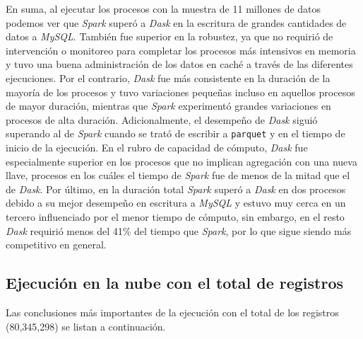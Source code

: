 En suma, al ejecutar los procesos con la muestra de 11 millones de datos podemos ver que \textit{Spark} superó a \textit{Dask} en la escritura de grandes cantidades de datos a \textit{MySQL}. También fue superior en la robustez, ya que no requirió de intervención o monitoreo para completar los procesos más intensivos en memoria y tuvo una buena administración de los datos en caché a través de las diferentes ejecuciones. Por el contrario, \textit{Dask} fue más consistente en la duración de la mayoría de los procesos y tuvo variaciones pequeñas incluso en aquellos procesos de mayor duración, mientras que \textit{Spark} experimentó grandes variaciones en procesos de alta duración. Adicionalmente, el desempeño de \textit{Dask} siguió superando al de \textit{Spark} cuando se trató de escribir a \texttt{parquet} y en el tiempo de inicio de la ejecución. En el rubro de capacidad de cómputo, \textit{Dask} fue especialmente superior en los procesos que no implican agregación con una nueva llave, procesos en los cuáles el tiempo de \textit{Spark} fue de menos de la mitad que el de \textit{Dask}. Por último, en la duración total \textit{Spark} superó a \textit{Dask} en dos procesos debido a su mejor desempeño en escritura a \textit{MySQL} y estuvo muy cerca en un tercero influenciado por el menor tiempo de cómputo, sin embargo, en el resto \textit{Dask} requirió menos del 41\% del tiempo que \textit{Spark}, por lo que sigue siendo más competitivo en general. 



\subsection{Ejecución en la nube con el total de registros}

Las conclusiones más importantes de la ejecución con el total de los registros (80,345,298) se listan a continuación.


